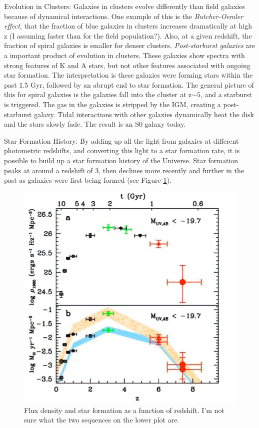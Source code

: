 Evolution in Clusters:\newline
Galaxies in clusters evolve differently than field galaxies because of 
dynamical interactions.  One example of this is the 
\emph{Butcher-Oemler effect}, that the fraction of blue galaxies in clusters 
increases dramatically at high z (I assuming faster than for the field 
population?).  Also, at a given redshift, the fraction of spiral galaxies is 
smaller for denser clusters.  \emph{Post-starburst galaxies} are a 
important product of evolution in clusters.  These galaxies show spectra 
with strong features of K and A stars, but not other features associated with 
ongoing star formation.  The interpretation is these galaxies were forming 
stars within the past $1.5$ Gyr, followed by an abrupt end to star formation.  
The general picture of this for spiral galaxies is the galaxies fall into 
the cluster at z$\sim5$, and a starburst is triggered.  The gas in the 
galaxies is stripped by the IGM, creating a post-starburst galaxy.  
Tidal interactions with other galaxies dynamically heat the disk and the 
stars slowly fade.  The result is an S0 galaxy today.  

Star Formation History:\newline
By adding up all the light from galaxies at different photometric redshifts, 
and converting this light to a star formation rate, it is possible to 
build up a star formation history of the Universe.  Star formation peaks 
at around a redshift of 3, then declines more recently and further in the past 
as galaxies were first being formed (see Figure \ref{fig:madau}).  

\begin{figure}
\begin{center}
\includegraphics[width=\textwidth]{madau.jpg}
\end{center}
\caption{Flux density and star formation as a function of redshift.  I'm not 
sure what the two sequences on the lower plot are.  
\label{fig:madau}}
\end{figure}

